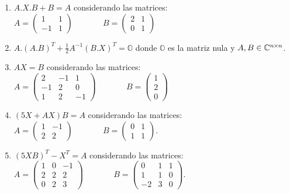 \documentclass[a4paper]{article}
\begin{document}
\begin{enumerate}
\begin{enumerate} [label=(\alph*)]
		\item $A.X.B+B=A$ considerando las matrices: \\ $A=\left( \begin{matrix} 1 & 1 \\ -1 & 1\end{matrix} \right)$ ~~~~~~ $B=\left( \begin{matrix} 2 & 1 \\ 0 & 1\end{matrix} \right)$ 
		\item $A.(A.B)^T + \frac{1}{2} A^{-1} (B.X)^T = \mathbb{O}$ donde $\mathbb{O}$ es la matriz nula y $A,B \in \mathbb{C}^{n \hspace{-0.2mm}\times \hspace{-0.2mm} n}$. 
		\item $AX=B$ considerando las matrices: \\ $A=\left(\begin{matrix} 2 & -1 & 1\\ -1 & 2 & 0 \\ 1 & 2 & -1 \end{matrix}\right)$ ~~~~~~ $B=\left(\begin{matrix} 1 \\ 2 \\ 0 \end{matrix}\right)$
		\item $ (5X + AX)B = A $ considerando las matrices: \\ $A=\left( \begin{matrix} 1 & -1 \\ 2 & 2\end{matrix} \right)$ ~~~~~~ $B=\left( \begin{matrix} 0 & 1 \\ 1 & 1\end{matrix} \right)$. 
		\item $ (5XB)^T - X^T = A$ considerando las matrices: \\ $A=\left( \begin{matrix} 1 & 0 & -1 \\ 2 & 2 & 2 \\ 0 & 2 & 3 \end{matrix} \right)$ ~~~~~~ $B=\left( \begin{matrix} 0 & 1 & 1 \\ 1 & 1 & 0 \\ -2 & 3 & 0\end{matrix} \right)$. 
	\end{enumerate}

\end{enumerate}
\end{document}
